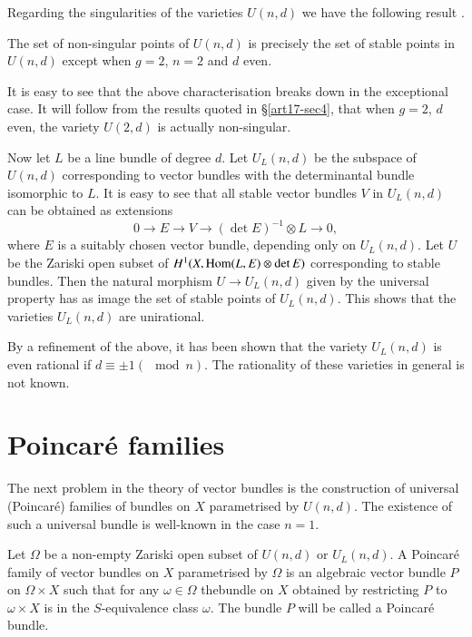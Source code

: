 Regarding the singularities of the varieties $U(n,d)$ we have the following result \cite{art17-key3}.

\begin{theorem}\label{art17-thm2.1}
The set of non-singular points of $U(n,d)$ is precisely the set of stable points in $U(n,d)$ except when $g=2$, $n=2$ and $d$ even.
\end{theorem}

It is easy to see that the above characterisation breaks down in the exceptional case. It will follow from the results quoted in \S\ref{art17-sec4}, that when $g=2$, $d$ even, the variety $U(2,d)$ is actually non-singular.

Now let $L$ be a line bundle of degree $d$. Let $U_{L}(n,d)$ be the subspace of $U(n,d)$ corresponding to vector bundles with the determinantal bundle isomorphic to $L$. It is easy to see \cite[\S3]{art17-key4} that all stable vector bundles $V$ in $U_{L}(n,d)$ can be obtained as extensions
$$
0\to E\to V\to (\det E)^{-1}\otimes L\to 0,
$$
where $E$ is a suitably chosen vector bundle, depending only on $U_{L}(n,d)$. Let $U$ be the Zariski open subset of $H^{1}(X,\operatorname{\mathrm{Hom}}(L,E)\otimes \det E)$ corresponding to stable bundles. Then the natural morphism $U\to U_{L}(n,d)$ given by the universal property has as image the set of stable points of $U_{L}(n,d)$. This shows that the varieties $U_{L}(n,d)$ are unirational.

By a refinement of the above, it has been shown that the variety $U_{L}(n,d)$ is even rational if $d\equiv \pm 1(\mod n)$. The rationality of these varieties in general is not known.

\section{Poincar\'e families}\label{art17-sec3}

The next problem in the theory of vector bundles is the construction of universal (Poincar\'e) families of bundles on $X$ parametrised by $U(n,d)$. The existence of such a universal bundle is well-known in the case $n=1$.

\begin{defi*}
Let $\Omega$ be a non-empty Zariski open subset of $U(n,d)$ or $U_{L}(n,d)$. A Poincar\'e family of vector bundles on $X$ parametrised by $\Omega$ is an algebraic vector bundle $P$ on $\Omega\times X$ such that for any $\omega\in \Omega$ the\pageoriginale bundle on $X$ obtained by restricting $P$ to $\omega\times X$ is in the $S$-equivalence class $\omega$. The bundle $P$ will be called a Poincar\'e bundle.
\end{defi*}

